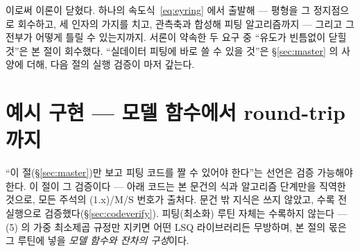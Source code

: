 \documentclass[11pt,a4paper]{article}
\begin{document}
\medskip
이로써 이론이 닫혔다. 하나의 속도식~\eqref{eq:eyring} 에서 출발해 — 평형을 그 정지점으로 회수하고, 세
인자의 가지를 치고, 관측축과 합성해 피팅 알고리즘까지 — 그리고 그 전부가 어떻게 틀릴 수 있는지까지.
서론이 약속한 두 요구 중 ``유도가 빈틈없이 닫힐 것''은 본 절이 회수했다. ``실데이터 피팅에 바로 쓸 수
있을 것''은 \S\ref{sec:master} 의 사양에 더해, 다음 절의 실행 검증이 마저 갚는다.

\section{예시 구현 — 모델 함수에서 round-trip 까지}\label{sec:code}
``이 절(\S\ref{sec:master})만 보고 피팅 코드를 짤 수 있어야 한다''는 선언은 검증 가능해야 한다. 이
절이 그 검증이다 — 아래 코드는 본 문건의 식과 알고리즘 단계만을 직역한 것으로, 모든 주석의 (1.x)/M/S
번호가 출처다. 문건 밖 지식은 쓰지 않았고, 수록 전 실행으로 검증했다(\S\ref{sec:codeverify}).
피팅(최소화) 루틴 자체는 수록하지 않는다 — (5) 의 가중 최소제곱 규정만 지키면 어떤 LSQ 라이브러리든
무방하며, 본 절의 몫은 그 루틴에 넣을 \emph{모델 함수와 잔차의 구성}이다.
\end{document}
